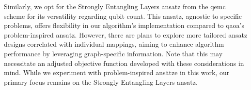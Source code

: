 Similarly, we opt for the Strongly Entangling Layers ansatz from the \acrshort{qemc} scheme for its versatility regarding qubit count. This ansatz, agnostic to specific problems, offers flexibility in our algorithm's implementation compared to \acrshort{qaoa}'s problem-inspired ansatz. However, there are plans to explore more tailored ansatz designs correlated with individual mappings, aiming to enhance algorithm performance by leveraging graph-specific information. Note that this may necessitate an adjusted objective function developed with these considerations in mind. While we experiment with problem-inspired ansätze in this work, our primary focus remains on the Strongly Entangling Layers ansatz.







